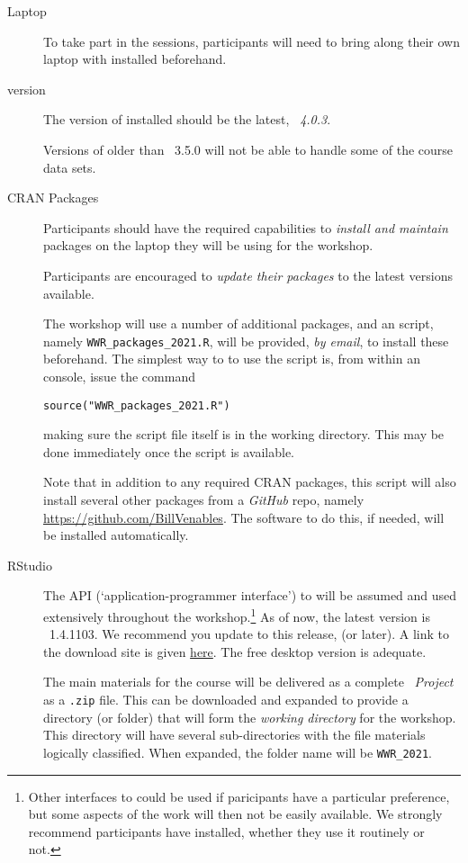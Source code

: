 \documentclass[12pt]{article}
\begin{document}
\begin{description}
\item[Laptop] To take part in the sessions, participants will need to
  bring along their own laptop with \R installed beforehand.
  
\item[\R version] The version of \R installed should be the latest,
  \emph{\R~4.0.3}.

  Versions of \R older than \R~3.5.0 will not be able to
  handle some of the course data sets.

\item[CRAN Packages] Participants should have the required
  capabilities to \emph{install and maintain} \R packages on the
  laptop they will be using for the workshop.

  Participants are encouraged to \emph{update their packages} to the
  latest versions available.

  The workshop will use a number of additional \R packages, and
  an \R script, namely \verb|WWR_packages_2021.R|, will be provided,
  \emph{by email}, to install these beforehand. The simplest way to
  to use the script is, from within an \R console, issue the command

  \verb|source("WWR_packages_2021.R")|

  making sure the script file itself is in the \R working directory.
  This may be done immediately once the script is available.

  Note that in addition to any required CRAN packages, this script
  will also install several other packages from a \emph{GitHub} repo,
  namely \url{https://github.com/BillVenables}.  The software to do
  this, if needed, will be installed automatically.

  
\item[RStudio] The \RStudio API (`application-programmer interface')
  to \R will be assumed and used extensively throughout the
  workshop.\footnote{Other interfaces to \R could be used if
    paricipants have a particular preference, but some aspects of the
    work will then not be easily available.  We strongly recommend
    participants have \RStudio installed, whether they use it
    routinely or not.}  As of now, the latest version is
  \RStudio~1.4.1103.  We recommend you update to this release, (or
  later).  A link to the download site is given
  \href{https://rstudio.com/products/rstudio/download/}{here}. The
  free desktop version is adequate.

  The main materials for the course will be delivered as a complete
  \RStudio~\emph{Project} as a \verb|.zip| file.  This can be
  downloaded and expanded to provide a directory (or folder) that will
  form the \emph{working directory} for the workshop.  This directory
  will have several sub-directories with the file materials logically
  classified.  When expanded, the folder name will be \verb|WWR_2021|.


\end{description}
\end{document}
